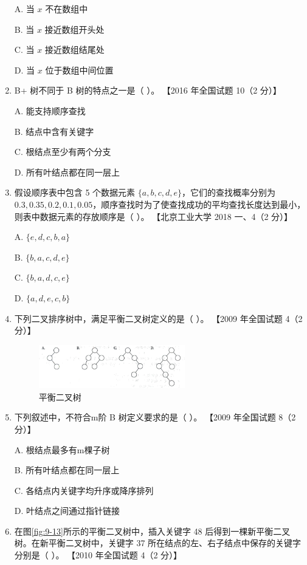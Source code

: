 \documentclass[lang=cn,newtx,10pt,scheme=chinese]{../../elegantbook}
\begin{document}
\begin{enumerate}
    A. 当 $x$ 不在数组中  

    B. 当 $x$ 接近数组开头处  

    C. 当 $x$ 接近数组结尾处 

    D. 当 $x$ 位于数组中间位置  

    \item B+ 树不同于 B 树的特点之一是（ ）。  
    【2016 年全国试题 10（2 分）】  

    A. 能支持顺序查找  

    B. 结点中含有关键字  

    C. 根结点至少有两个分支  

    D. 所有叶结点都在同一层上  


    \item 假设顺序表中包含 5 个数据元素 $\{a, b, c, d, e\}$，它们的查找概率分别为 $0.3, 0.35, 0.2, 0.1, 0.05$，顺序查找时为了使查找成功的平均查找长度达到最小，则表中数据元素的存放顺序是（ ）。  
    【北京工业大学 2018 一、4（2 分）】  

    A. $\{e, d, c, b, a\}$  

    B. $\{b, a, c, d, e\}$
     
    C. $\{b, a, d, c, e\}$  

    D. $\{a, d, e, c, b\}$  

    \item 下列二叉排序树中，满足平衡二叉树定义的是（ ）。  
    【2009 年全国试题 4（2 分）】  

    \begin{figure}[h!]
        \centering
        \includegraphics[width=0.6\textwidth]{../../figure/exercisePicPDF/chapter9/9-11.pdf}
        \caption{平衡二叉树}
        \label{fig:9-11}
    \end{figure}

    \item 下列叙述中，不符合m阶 B 树定义要求的是（ ）。  
    【2009 年全国试题 8（2 分）】 

    A. 根结点最多有m棵子树  

    B. 所有叶结点都在同一层上  

    C. 各结点内关键字均升序或降序排列  

    D. 叶结点之间通过指针链接  

    \item 在图\ref{fig:9-13}所示的平衡二叉树中，插入关键字 48 后得到一棵新平衡二叉树。在新平衡二叉树中，关键字 37 所在结点的左、右子结点中保存的关键字分别是（ ）。  
    【2010 年全国试题 4（2 分）】


\end{enumerate}
\end{document}
